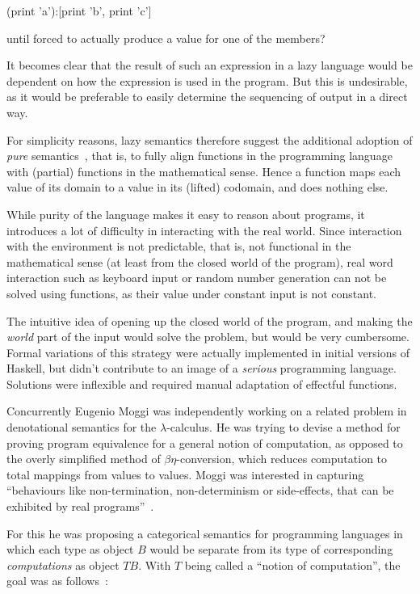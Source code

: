 \begin{code}
  (print 'a'):[print 'b', print 'c']
\end{code}

until forced to actually produce a value for one of the members?

It becomes clear that the result of such an expression in a lazy
language would be dependent on how the expression is used in the
program. But this is undesirable, as it would be preferable to easily
determine the sequencing of output in a direct way.

For simplicity reasons, lazy semantics therefore suggest the additional
adoption of \emph{pure} semantics~\cite[p. 12-8]{hask-history}, that is, to
fully align functions in the programming language with (partial) functions in
the mathematical sense.  Hence a function maps each value of its domain to a
value in its (lifted) codomain, and does nothing else.

While purity of the language makes it easy to reason about programs, it
introduces a lot of difficulty in interacting with the real world. Since
interaction with the environment is not predictable, that is, not
functional in the mathematical sense (at least from the closed world of
the program), real word interaction such as keyboard input or random
number generation can not be solved using functions, as their value
under constant input is not constant.

The intuitive idea of opening up the closed world of the program, and
making the \emph{world} part of the input would solve the problem, but
would be very cumbersome. Formal variations of this strategy were
actually implemented in initial versions of Haskell, but didn't
contribute to an image of a \emph{serious} programming language.
Solutions were inflexible and required manual adaptation of effectful
functions.

Concurrently Eugenio Moggi was independently working on a related problem in
denotational semantics for the $\lambda$-calculus. He was trying to devise a
method for proving program equivalence for a general notion of computation, as
opposed to the overly simplified method of $\beta\eta$-conversion, which
reduces computation to total mappings from values to values. Moggi was
interested in capturing ``behaviours like non-termination, non-determinism or
side-effects, that can be exhibited by real programs''~\cite[p.
1]{moggi-89}.

For this he was proposing a categorical semantics for programming languages in
which each type as object $B$ would be separate from its type of corresponding
\emph{computations} as object $TB$. With $T$ being called a ``notion of
computation'', the goal was as follows~\cite[p. 2]{moggi-89}:

